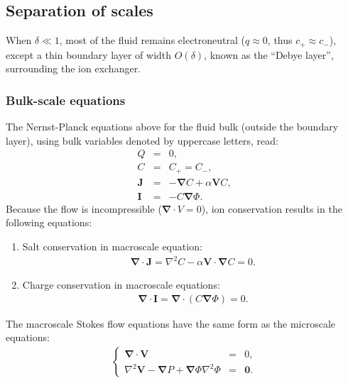 \documentclass[final]{elsarticle}
\newcommand{\brc}[2]{\left\{\begin{array}{#1}#2\end{array}\right.}
\newcommand{\pars}[1]{\left(#1\right)}
\newcommand\Laplacian{\nabla^2}
\newcommand\bnabla{\boldsymbol{\nabla}}
\newcommand\bV{\boldsymbol{V}}
\newcommand\bI{\boldsymbol{I}}
\newcommand\bJ{\boldsymbol{J}}
\newcommand\bzero{\boldsymbol{0}}
\begin{document}
\subsection{Separation of scales}
When $\delta \ll 1$, 
most of the fluid remains electroneutral ($q \approx 0$, thus $c_+ \approx c_-$), 
except a thin boundary layer of width $O(\delta)$, 
known as the ``Debye layer'', surrounding the ion exchanger. 

\subsubsection  {Bulk-scale equations}
The Nernst-Planck equations above for the fluid bulk (outside
the boundary layer), using bulk variables denoted by uppercase letters, read:
\begin{eqnarray*}
  Q & = & 0, \\
  C & = & C_+ = C_-, \\
\bJ &=& -\bnabla C + \alpha \bV C, \\
\bI &=& -C \bnabla \varPhi.
\end{eqnarray*}
Because the flow is incompressible ($\bnabla \cdot V = 0$), 
ion conservation results in the following equations:

\begin{enumerate}
\item Salt conservation in macroscale equation:
\begin{eqnarray*} \label{eq:salt}
\bnabla \cdot \bJ = \Laplacian C - \alpha \bV \cdot \bnabla C = 0. 
\end{eqnarray*}

\item Charge conservation in macroscale equations:
\begin{eqnarray*} \label{eq:charge}
\bnabla \cdot \bI = \bnabla \cdot \pars{ C \bnabla \varPhi } = 0.
\end{eqnarray*}

\end{enumerate}

The macroscale Stokes flow equations have the same form as the microscale equations:
\begin{eqnarray*}  \label{eq:stokes}
\brc{rcc}{\bnabla \cdot \bV &=& 0, \\  
\Laplacian \bV - \bnabla P + \bnabla \varPhi \Laplacian \varPhi &=& \bzero.}
\end{eqnarray*}
\end{document}
